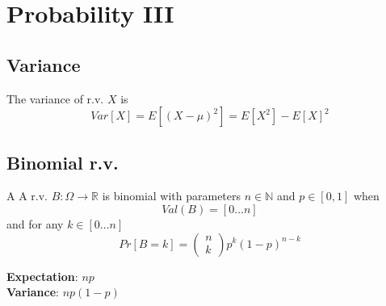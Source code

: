 \chapter{Probability III}

\section{Variance }

\begin{framed}
  The variance of r.v. $X$ is
  \[
     Var[X] = E[(X - \mu)^2] = E[X^2] - E[X]^2
  \] 
\end{framed}

\section{Binomial r.v.}
\begin{framed}A
   A r.v. $B: \Omega \rightarrow \mathbb{R}$ is binomial with parameters $n \in \mathbb{N}$ and $p \in [0, 1]$ when
    \[
       Val(B) = [0 \hdots n]
   \] 
   and for any $k \in [0 \hdots n]$
    \[
       Pr[B = k] = \begin{pmatrix} n \\ k \end{pmatrix}  p^k (1 - p)^{n - k}
   \] 

   \textbf{Expectation}: $np$ \\
   \textbf{Variance}: $np(1-p)$ \\
\end{framed}


